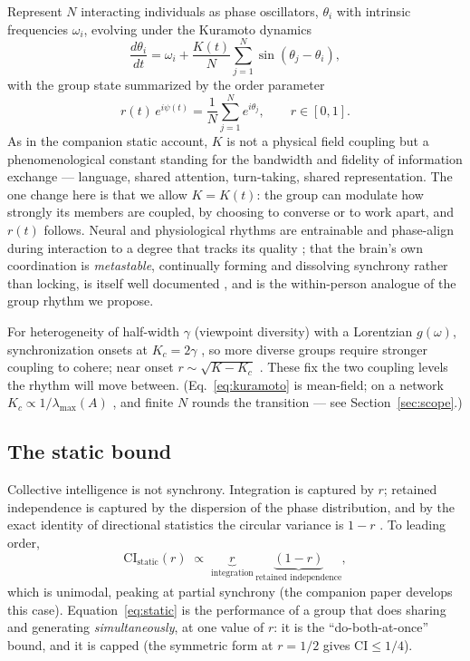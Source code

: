 \documentclass[11pt]{article}
\begin{document}
Represent $N$ interacting individuals as phase oscillators, $\theta_i$ with intrinsic frequencies $\omega_i$, evolving under the Kuramoto dynamics \citep{kuramoto1984chemical, strogatz2000kuramoto}
\begin{equation}
\frac{d\theta_i}{dt} = \omega_i + \frac{K(t)}{N}\sum_{j=1}^{N}\sin(\theta_j - \theta_i),
\label{eq:kuramoto}
\end{equation}
with the group state summarized by the order parameter
\begin{equation}
r(t)\,e^{i\psi(t)} = \frac{1}{N}\sum_{j=1}^{N} e^{i\theta_j}, \qquad r \in [0,1].
\label{eq:order}
\end{equation}
As in the companion static account, $K$ is not a physical field coupling but a phenomenological constant standing for the bandwidth and fidelity of information exchange --- language, shared attention, turn-taking, shared representation. The one change here is that we allow $K = K(t)$: the group can modulate how strongly its members are coupled, by choosing to converse or to work apart, and $r(t)$ follows. Neural and physiological rhythms are entrainable and phase-align during interaction to a degree that tracks its quality \citep{stephens2010speaker, dikker2017brain}; that the brain's own coordination is \emph{metastable}, continually forming and dissolving synchrony rather than locking, is itself well documented \citep{tognoli2014metastable}, and is the within-person analogue of the group rhythm we propose.

For heterogeneity of half-width $\gamma$ (viewpoint diversity) with a Lorentzian $g(\omega)$, synchronization onsets at $K_c = 2\gamma$ \citep{acebron2005kuramoto}, so more diverse groups require stronger coupling to cohere; near onset $r \sim \sqrt{K-K_c}$ \citep{strogatz2000kuramoto}. These fix the two coupling levels the rhythm will move between. (Eq.~\eqref{eq:kuramoto} is mean-field; on a network $K_c \propto 1/\lambda_{\max}(A)$ \citep{restrepo2005onset}, and finite $N$ rounds the transition --- see Section~\ref{sec:scope}.)

\subsection{The static bound}

Collective intelligence is not synchrony. Integration is captured by $r$; retained independence is captured by the dispersion of the phase distribution, and by the exact identity of directional statistics the circular variance is $1-r$ \citep{mardia2000directional}. To leading order,
\begin{equation}
\mathrm{CI}_{\text{static}}(r) \;\propto\; \underbrace{r}_{\text{integration}}\,\underbrace{(1-r)}_{\text{retained independence}},
\label{eq:static}
\end{equation}
which is unimodal, peaking at partial synchrony (the companion paper develops this case). Equation~\eqref{eq:static} is the performance of a group that does sharing and generating \emph{simultaneously}, at one value of $r$: it is the ``do-both-at-once'' bound, and it is capped (the symmetric form at $r=1/2$ gives $\mathrm{CI}\le 1/4$).
\end{document}
